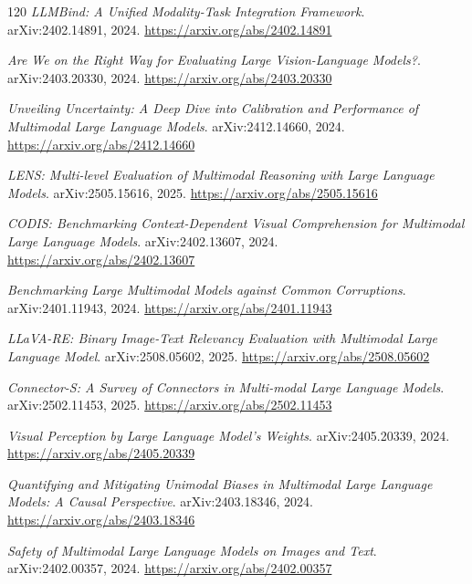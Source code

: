 \documentclass[11pt,a4paper]{article}
\begin{document}
\begin{thebibliography}{120}
\newblock \emph{LLMBind: A Unified Modality-Task Integration Framework}.
\newblock arXiv:2402.14891, 2024.
\newblock \url{https://arxiv.org/abs/2402.14891}

\newblock \emph{Are We on the Right Way for Evaluating Large Vision-Language Models?}.
\newblock arXiv:2403.20330, 2024.
\newblock \url{https://arxiv.org/abs/2403.20330}

\newblock \emph{Unveiling Uncertainty: A Deep Dive into Calibration and Performance of Multimodal Large Language Models}.
\newblock arXiv:2412.14660, 2024.
\newblock \url{https://arxiv.org/abs/2412.14660}

\newblock \emph{LENS: Multi-level Evaluation of Multimodal Reasoning with Large Language Models}.
\newblock arXiv:2505.15616, 2025.
\newblock \url{https://arxiv.org/abs/2505.15616}

\newblock \emph{CODIS: Benchmarking Context-Dependent Visual Comprehension for Multimodal Large Language Models}.
\newblock arXiv:2402.13607, 2024.
\newblock \url{https://arxiv.org/abs/2402.13607}

\newblock \emph{Benchmarking Large Multimodal Models against Common Corruptions}.
\newblock arXiv:2401.11943, 2024.
\newblock \url{https://arxiv.org/abs/2401.11943}

\newblock \emph{LLaVA-RE: Binary Image-Text Relevancy Evaluation with Multimodal Large Language Model}.
\newblock arXiv:2508.05602, 2025.
\newblock \url{https://arxiv.org/abs/2508.05602}

\newblock \emph{Connector-S: A Survey of Connectors in Multi-modal Large Language Models}.
\newblock arXiv:2502.11453, 2025.
\newblock \url{https://arxiv.org/abs/2502.11453}

\newblock \emph{Visual Perception by Large Language Model's Weights}.
\newblock arXiv:2405.20339, 2024.
\newblock \url{https://arxiv.org/abs/2405.20339}

\newblock \emph{Quantifying and Mitigating Unimodal Biases in Multimodal Large Language Models: A Causal Perspective}.
\newblock arXiv:2403.18346, 2024.
\newblock \url{https://arxiv.org/abs/2403.18346}

\newblock \emph{Safety of Multimodal Large Language Models on Images and Text}.
\newblock arXiv:2402.00357, 2024.
\newblock \url{https://arxiv.org/abs/2402.00357}


\end{thebibliography}
\end{document}
